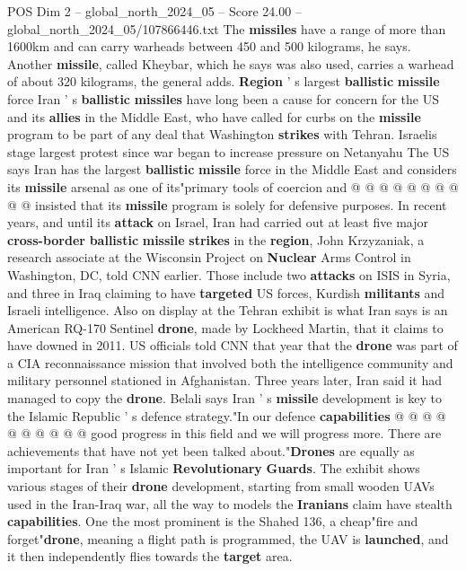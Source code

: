 \begin{textsample}{POS Dim 2 – global\_north\_2024\_05 – Score 24.00 – global\_north\_2024\_05/107866446.txt}
The \textbf{missiles} have a range of more than 1600km and can carry warheads between 450 and 500 kilograms, he says.
Another \textbf{missile}, called Kheybar, which he says was also used, carries a warhead of about 320 kilograms, the general adds. \textbf{Region} ' s largest \textbf{ballistic} \textbf{missile} force Iran ' s \textbf{ballistic} \textbf{missiles} have long been a cause for concern for the US and its \textbf{allies} in the Middle East, who have called for curbs on the \textbf{missile} program to be part of any deal that Washington \textbf{strikes} with Tehran.
Israelis stage largest protest since war began to increase pressure on Netanyahu The US says Iran has the largest \textbf{ballistic} \textbf{missile} force in the Middle East and considers its \textbf{missile} arsenal as one of its"primary tools of coercion and @ @ @ @ @ @ @ @ @ @ insisted that its \textbf{missile} program is solely for defensive purposes.
In recent years, and until its \textbf{attack} on Israel, Iran had carried out at least five major \textbf{cross-border} \textbf{ballistic} \textbf{missile} \textbf{strikes} in the \textbf{region}, John Krzyzaniak, a research associate at the Wisconsin Project on \textbf{Nuclear} Arms Control in Washington, DC, told CNN earlier.
Those include two \textbf{attacks} on ISIS in Syria, and three in Iraq claiming to have \textbf{targeted} US forces, Kurdish \textbf{militants} and Israeli intelligence.
Also on display at the Tehran exhibit is what Iran says is an American RQ-170 Sentinel \textbf{drone}, made by Lockheed Martin, that it claims to have downed in 2011.
US officials told CNN that year that the \textbf{drone} was part of a CIA reconnaissance mission that involved both the intelligence community and military personnel stationed in Afghanistan.
Three years later, Iran said it had managed to copy the \textbf{drone}.
Belali says Iran ' s \textbf{missile} development is key to the Islamic Republic ' s defence strategy."In our defence \textbf{capabilities} @ @ @ @ @ @ @ @ @ @ good progress in this field and we will progress more.
There are achievements that have not yet been talked about."\textbf{Drones} are equally as important for Iran ' s Islamic \textbf{Revolutionary} \textbf{Guards}.
The exhibit shows various stages of their \textbf{drone} development, starting from small wooden UAVs used in the Iran-Iraq war, all the way to models the \textbf{Iranians} claim have stealth \textbf{capabilities}.
One the most prominent is the Shahed 136, a cheap"fire and forget"\textbf{drone}, meaning a flight path is programmed, the UAV is \textbf{launched}, and it then independently flies towards the \textbf{target} area.

\end{textsample}
